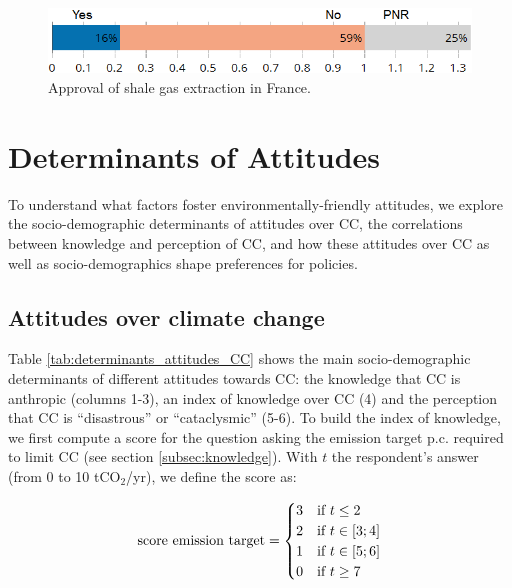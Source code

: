\documentclass[english,5p,authoryear]{elsarticle}
\begin{document}
\begin{figure}[!htbp]
\centering
\includegraphics[width=0.9\columnwidth]{Images/shale_val_nolegend_trim.png}
\caption{Approval of shale gas extraction in France.}
\label{fig:shale}
\end{figure}



\section{Determinants of Attitudes\label{sec:determinants}}

To understand what factors foster environmentally-friendly attitudes, we explore the socio-demographic determinants of attitudes over CC, the correlations between knowledge and perception of CC, and how these attitudes over CC as well as socio-demographics shape preferences for policies. 

    \subsection{Attitudes over climate change}\label{sec:determinants_attitudes_CC}

Table \ref{tab:determinants_attitudes_CC} shows the main socio-demographic determinants of different attitudes towards CC: the knowledge that CC is anthropic (columns 1-3), an index of knowledge over CC (4) and the perception that CC is ``disastrous'' or ``cataclysmic'' (5-6). To build the index of knowledge, we first compute a score for the question asking the emission target p.c. required to limit CC (see section \ref{subsec:knowledge}). With $t$ the respondent's answer (from 0 to 10 tCO$_2$/yr), we define the score as:

\begin{equation}
\textnormal{score emission target}=\begin{cases}
3 & \text{if }t\leq2\\
2 & \text{if }t\in\left[3;4\right]\\
1 & \text{if }t\in\left[5;6\right]\\
0 & \text{if }t\geq7
\end{cases}
\end{equation}
\end{document}

